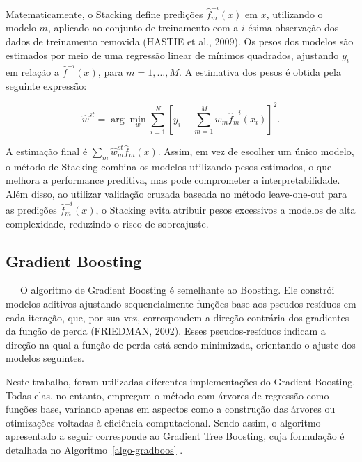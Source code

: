 \documentclass[
  12pt,
  a4paper,
]{scrreprt}
\begin{document}
Matematicamente, o Stacking define predições
\(\hat{f}_m^{-i}\left(x\right)\) em \(x\), utilizando o modelo \(m\),
aplicado ao conjunto de treinamento com a \(i\text{-ésima}\) observação
dos dados de treinamento removida (HASTIE et al., 2009). Os pesos dos
modelos são estimados por meio de uma regressão linear de mínimos
quadrados, ajustando \(y_i\) em relação a
\(\hat{f}^{-i}\left(x\right)\), para \(m=1,\dots,M\). A estimativa dos
pesos é obtida pela seguinte expressão:

\[
\hat{w}^{st} = \arg \min_{w} \sum^{N}_{i = 1} \left[y_i - \sum^{M}_{m = 1} w_m \hat{f}^{-i}_m\left(x_i\right)\right]^2\text{.}
\]

A estimação final é \(\sum_{m} \hat{w}_m^{st} \hat{f}_m\left(x\right)\).
Assim, em vez de escolher um único modelo, o método de Stacking combina
os modelos utilizando pesos estimados, o que melhora a performance
preditiva, mas pode comprometer a interpretabilidade. Além disso, ao
utilizar validação cruzada baseada no método leave-one-out para as
predições \(\hat{f}^{-i}_{m}\left(x\right)\), o Stacking evita atribuir
pesos excessivos a modelos de alta complexidade, reduzindo o risco de
sobreajuste.

\subsection{Gradient Boosting}\label{gradient-boosting}

~~~O algoritmo de Gradient Boosting é semelhante ao Boosting. Ele
constrói modelos aditivos ajustando sequencialmente funções base aos
pseudos-resíduos em cada iteração, que, por sua vez, correspondem a
direção contrária dos gradientes da função de perda (FRIEDMAN, 2002).
Esses pseudos-resíduos indicam a direção na qual a função de perda está
sendo minimizada, orientando o ajuste dos modelos seguintes.

\vspace{12pt}

Neste trabalho, foram utilizadas diferentes implementações do Gradient
Boosting. Todas elas, no entanto, empregam o método com árvores de
regressão como funções base, variando apenas em aspectos como a
construção das árvores ou otimizações voltadas à eficiência
computacional. Sendo assim, o algoritmo apresentado a seguir corresponde
ao Gradient Tree Boosting, cuja formulação é detalhada no
 Algoritmo~\ref{algo-gradboos} .
\end{document}

